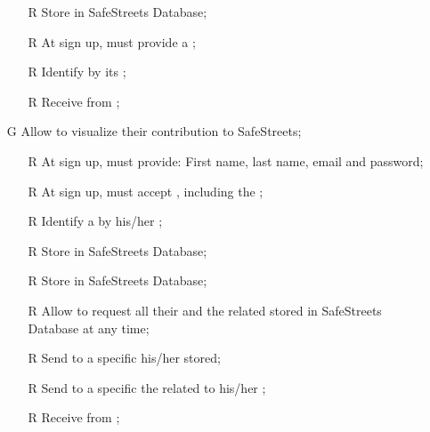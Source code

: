 \documentclass[../../../rasd.tex]{subfiles}
\begin{document}
\begin{itemize}
\begin{itemize}
		\item[R\subs{12}]Store  in SafeStreets Database;
		\item[R\subs{31}]At sign up,  must provide a ;
		\item[R\subs{32}]Identify  by its ;
		\item[R\subs{33}]Receive  from ;
	

	\end{itemize}

	\item[G\subs{8}]Allow  to visualize their contribution to SafeStreets;
	\begin{itemize}
		\item[R\subs{1}]At sign up,  must provide: First name, last name, email and password;
		\item[R\subs{2}]At sign up,  must accept , including the ;
		\item[R\subs{3}]Identify a  by his/her ;
		\item[R\subs{10}]Store  in SafeStreets Database;
		\item[R\subs{12}]Store  in SafeStreets Database;
		\item[R\subs{20}]Allow  to request all their  and the related  stored in SafeStreets Database at any time;
		\item[R\subs{21}]Send to a specific  his/her  stored;
		\item[R\subs{22}]Send to a specific  the  related to his/her ;
		\item[R\subs{33}]Receive  from ;
		
	\end{itemize}

\end{itemize}
\end{document}
